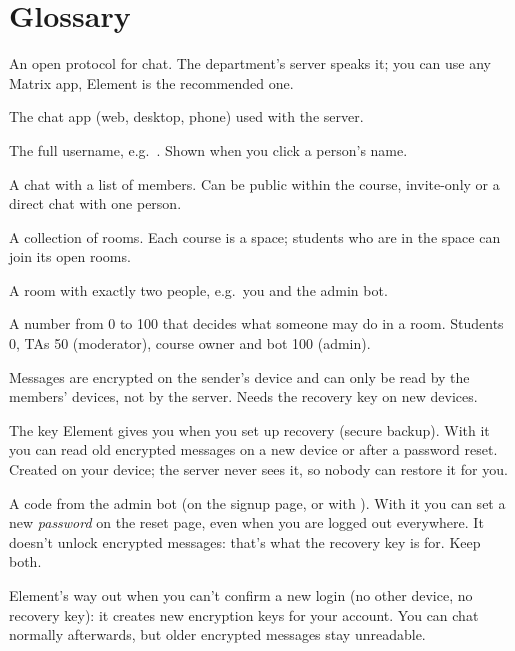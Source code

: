 \chapter{Glossary}
\label{ch:glossary}

\begin{description}[style=nextline,leftmargin=1.5em,font=\normalfont\bfseries]
  \item[Matrix] An open protocol for chat. The department's server \server{} speaks it; you
    can use any Matrix app, Element is the recommended one.
  \item[Element] The chat app (web, desktop, phone) used with the server.
  \item[Matrix ID] The full username, e.g.\ . Shown
    when you click a person's name.
  \item[Room] A chat with a list of members. Can be public within the course, invite-only or
    a direct chat with one person.
  \item[Space] A collection of rooms. Each course is a space; students who are in the space
    can join its open rooms.
  \item[Direct chat (DM)] A room with exactly two people, e.g.\ you and the admin bot.
  \item[Power level] A number from 0 to 100 that decides what someone may do in a room.
    Students 0, TAs 50 (moderator), course owner and bot 100 (admin).
  \item[End-to-end encryption] Messages are encrypted on the sender's device and can only be
    read by the members' devices, not by the server. Needs the recovery key on new devices.
  \item[Recovery key] The key Element gives you when you set up recovery (secure backup). With
    it you can read old encrypted messages on a new device or after a password reset. Created
    on your device; the server never sees it, so nobody can restore it for you.
  \item[Reset code] A code from the admin bot (on the signup page, or with
    ). With it you can set a new \emph{password} on the reset page,
    even when you are logged out everywhere. It doesn't unlock encrypted messages: that's
    what the recovery key is for. Keep both.
  \item[Reset identity] Element's way out when you can't confirm a new login (no other
    device, no recovery key): it creates new encryption keys for your account. You can chat
    normally afterwards, but older encrypted messages stay unreadable.

\end{description}

